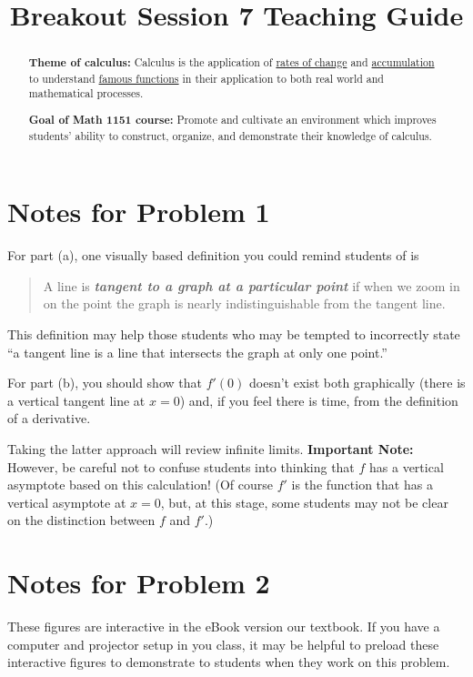 \documentclass[nooutcomes]{ximera}
\title{Breakout Session 7 Teaching Guide}
\begin{document}
\begin{abstract}
 \textbf{Theme of calculus:} Calculus is the application of  \href{https://en.wikipedia.org/wiki/Derivative}{rates of change} and \href{https://en.wikipedia.org/wiki/Integral}{accumulation} to understand \href{https://en.wikipedia.org/wiki/Elementary_function}{famous functions} in their application to both real world and mathematical processes.

  \textbf{Goal of Math 1151 course:} Promote and cultivate an environment which improves students' ability to construct, organize, and demonstrate their knowledge of calculus.
\end{abstract}
\maketitle

\section{Notes for Problem 1}
For part (a), one visually based definition you could remind students of is
\begin{quote}
  A line is \textsl{\textbf{tangent to a graph at a particular point}} if when we zoom in on the point the graph is nearly indistinguishable from the tangent line.
\end{quote}
This definition may help those students who may be tempted to incorrectly state ``a tangent line is a line that intersects the graph at only one point.''

For part (b), you should show that $f'(0)$ doesn't exist both graphically (there is a vertical tangent line at $x = 0$) and, if you feel there is time, from the definition of a derivative.
        
Taking the latter approach will review infinite limits.
\textbf{Important Note:} However, be careful not to confuse students into thinking that $f$ has a vertical asymptote based on this calculation!
(Of course $f'$ is the function that has a vertical asymptote at $x = 0$, but, at this stage, some students may not be clear on the distinction between $f$ and $f'$.)

\section{Notes for Problem 2}
These figures are interactive in the eBook version our textbook. 
If you have a computer and projector setup in you class, it may be helpful to preload these interactive figures to demonstrate to students when they work on this problem.
\end{document}
